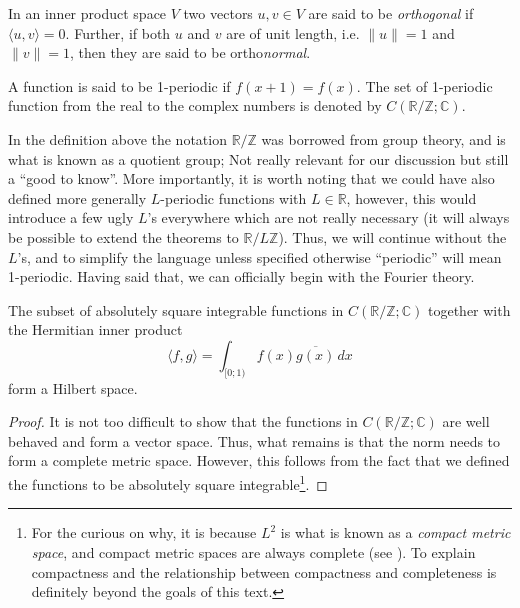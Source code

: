 \begin{definition}
  \label{kugel:def:orthogonality}
  In an inner product space \(V\) two vectors \(u, v \in V\) are said to be
  \emph{orthogonal} if \(\langle u, v \rangle = 0\). Further, if both \(u\)
  and \(v\) are of unit length, i.e. \(\| u \| = 1\) and \(\| v \| = 1\), then
  they are said to be ortho\emph{normal}.
\end{definition}

\begin{definition}
  A function is said to be 1-periodic if \(f(x + 1) = f(x)\). The set of
  1-periodic function from the real to the complex
  numbers is denoted by \(C(\mathbb{R}/\mathbb{Z}; \mathbb{C})\).
\end{definition}

In the definition above the notation \(\mathbb{R}/\mathbb{Z}\) was borrowed
from group theory, and is what is known as a quotient group; Not really
relevant for our discussion but still a ``good to know''. More importantly, it
is worth noting that we could have also defined more generally \(L\)-periodic
functions with \(L\in\mathbb{R}\), however, this would introduce a few ugly
\(L\)'s everywhere which are not really necessary (it will always be possible
to extend the theorems to \(\mathbb{R} / L\mathbb{Z}\)). Thus, we will
continue without the \(L\)'s, and to simplify the language unless specified
otherwise ``periodic'' will mean 1-periodic. Having said that, we can
officially begin with the Fourier theory.

\begin{lemma}
  The subset of absolutely square integrable functions in
  \(C(\mathbb{R}/\mathbb{Z}; \mathbb{C})\) together with the Hermitian inner
  product
  \[
    \langle f, g \rangle = \int_{[0; 1)} f(x) \overline{g(x)} \, dx
  \]
  form a Hilbert space.
\end{lemma}
\begin{proof}
  It is not too difficult to show that the functions in \(C(\mathbb{R} /
  \mathbb{Z}; \mathbb{C})\) are well behaved and form a vector space. Thus,
  what remains is that the norm needs to form a complete metric space.
  However, this follows from the fact that we defined the functions to be
  absolutely square integrable\footnote{For the curious on why, it is because
  \(L^2\) is what is known as a \emph{compact metric space}, and compact
  metric spaces are always complete (see \cite{eck_metric_2022,
  tao_analysis_2016}). To explain compactness and the relationship between
  compactness and completeness is definitely beyond the goals of this text.}.
\end{proof}

